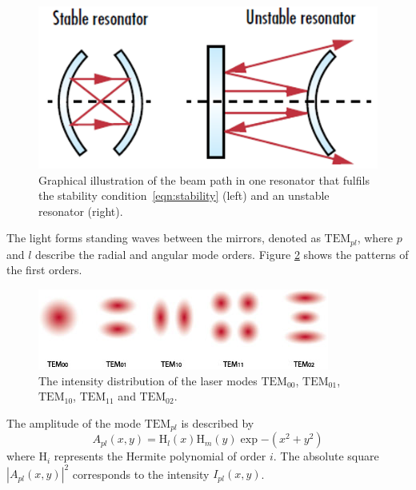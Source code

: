 \begin{figure}[H]
    \centering
    \includegraphics[scale=0.5]{pictures/resonator.png} %
    \caption{Graphical illustration of the beam path in one resonator that fulfils the stability condition~\eqref{eqn:stability} (left) and an unstable resonator (right).~\cite{resonator}}
    \label{fig:resonator}
\end{figure}
\noindent
The light forms standing waves between the mirrors, denoted as $\text{TEM}_{pl}$,
where $p$ and $l$ describe the radial and angular mode orders. Figure 
\ref{fig:TEM} shows the patterns of the first orders.
\begin{figure}[H]
    \centering
    \includegraphics[scale=0.8]{pictures/modes2.jpg} %
    \caption{The intensity distribution of the laser modes $\text{TEM}_{00}$, $\text{TEM}_{01}$, $\text{TEM}_{10}$, $\text{TEM}_{11}$ and $\text{TEM}_{02}$.~\cite{TEM2}}
    \label{fig:TEM}
\end{figure}
\noindent
The amplitude of the mode $\text{TEM}_{pl}$ is described by 
\begin{equation}
    A_{pl}(x,y)=\text{H}_l(x)\text{H}_m(y)\exp{-(x^2+y^2)}
    \label{eqn:TEM}
\end{equation}
where $\text{H}_i$ represents the Hermite polynomial of order $i$. 
The absolute square $|A_{pl}(x,y)|^2$ corresponds to the intensity
$I_{pl}(x,y)$.
